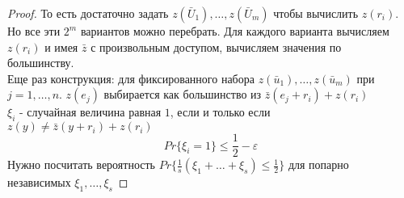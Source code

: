 \documentclass[a4paper]{article}
\theoremstyle{definition}
\theoremstyle{plain}
\begin{document}
\begin{proof}
	\noindent То есть достаточно задать $z(\bar{U}_1),\ldots, z(\bar{U}_m)$ чтобы вычислить $z(r_i)$.
	Но все эти $2^m$ вариантов можно перебрать. Для каждого варианта вычисляем $z(r_i)$ и имея $\bar{z}$
	с произвольным доступом, вычисляем значения по большинству.~\\
	
	\noindent Еще раз конструкция: для фиксированного набора $z(\bar{u}_1), \ldots, z(\bar{u}_m)$
	при $j = 1, \ldots, n$. $z(e_j)$ выбирается как большинство из $\bar{z}(e_j + r_i) + z(r_i)$~\\
	$\xi_i$ - случайная величина равная $1$, если и только если $z(y) \ne \bar{z}(y + r_i) + z(r_i)$
	$$
		Pr\{\xi_i = 1\} \le \frac{1}{2} - \varepsilon	
	$$
	Нужно посчитать вероятность $Pr\{\frac{1}{s}(\xi_1 + \ldots + \xi_s) \le \frac{1}{2}\}$ для
	попарно независимых $\xi_1, \ldots, \xi_s$
\end{proof}
\end{document}
